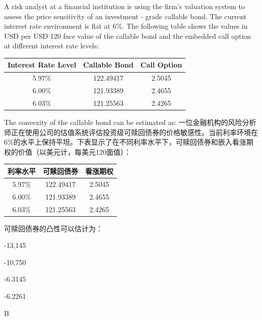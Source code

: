 \documentclass{article}
\newcounter{question} %
\begin{document}
\begin{question}
    A risk analyst at a financial institution is using the firm's valuation system to assess the price sensitivity of an investment - grade callable bond. The current interest rate environment is flat at 6\%. The following table shows the values in USD per USD 120 face value of the callable bond and the embedded call option at different interest rate levels:
    \begin{center}
    \begin{tabular}{|c|c|c|}
    \hline
    Interest Rate Level & Callable Bond & Call Option \\
    \hline
    5.97\% & 122.49417 & 2.5045 \\
    6.00\% & 121.93389 & 2.4655 \\
    6.03\% & 121.25563 & 2.4265 \\
    \hline
    \end{tabular}
    \end{center}
    The convexity of the callable bond can be estimated as:
    一位金融机构的风险分析师正在使用公司的估值系统评估投资级可赎回债券的价格敏感性。当前利率环境在6\%的水平上保持平坦。下表显示了在不同利率水平下，可赎回债券和嵌入看涨期权的价值（以美元计，每美元120面值）：
    \begin{center}
    \begin{tabular}{|c|c|c|}
    \hline
    利率水平 & 可赎回债券 & 看涨期权 \\
    \hline
    5.97\% & 122.49417 & 2.5045 \\
    6.00\% & 121.93389 & 2.4655 \\
    6.03\% & 121.25563 & 2.4265 \\
    \hline
    \end{tabular}
    \end{center}
    可赎回债券的凸性可以估计为：
    \end{question}
    
    \begin{choices}
        \item -13,145
        \item -10,750
        \item -6.3145
        \item -6.2261
    \end{choices}
    
    \begin{correctanswer}
        B
    \end{correctanswer}
    
\end{document}
